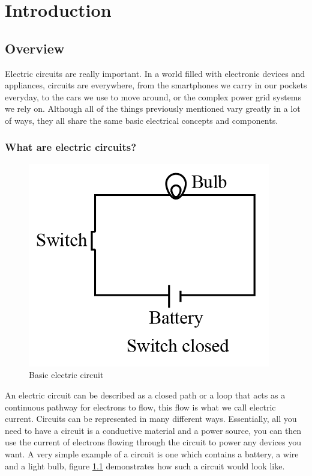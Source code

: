 \documentclass[../main.tex]{subfiles}
\begin{document}
\chapter{Introduction}

\section{Overview}
Electric circuits are really important. In a world filled with electronic devices and appliances, circuits are everywhere, from the smartphones we carry in our pockets everyday, to the cars we use to move around, or the complex power grid systems we rely on. Although all of the things previously mentioned vary greatly in a lot of ways, they all share the same basic electrical concepts and components.

\subsection{What are electric circuits?}
\begin{figure}[ht]
\centering
\includegraphics[scale=0.5]{images/chapter1/basic_circuit.png}
\caption{Basic electric circuit}
\label{fig:basic circuit}
\end{figure}
An electric circuit can be described as a closed path or a loop that acts as a continuous pathway for electrons to flow, this flow is what we call electric current. Circuits can be represented in many different ways. Essentially, all you need to have a circuit is a conductive material and a power source, you can then use the current of electrons flowing through the circuit to power any devices you want. A very simple example of a circuit is one which contains a battery, a wire and a light bulb, figure \ref{fig:basic circuit} demonstrates how such a circuit would look like.
\end{document}
